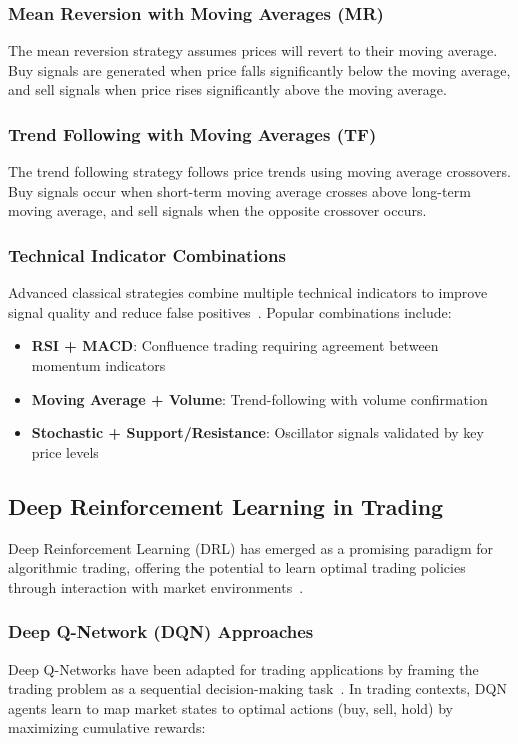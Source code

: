 \documentclass[10pt,twocolumn]{article}
\begin{document}
\subsubsection{Mean Reversion with Moving Averages (MR)}
The mean reversion strategy assumes prices will revert to their moving average. Buy signals are generated when price falls significantly below the moving average, and sell signals when price rises significantly above the moving average.

\subsubsection{Trend Following with Moving Averages (TF)}
The trend following strategy follows price trends using moving average crossovers. Buy signals occur when short-term moving average crosses above long-term moving average, and sell signals when the opposite crossover occurs.

\subsubsection{Technical Indicator Combinations}
Advanced classical strategies combine multiple technical indicators to improve signal quality and reduce false positives~\cite{technical_indicator_combinations}. Popular combinations include:
\begin{itemize}[itemsep=1pt]
\item \textbf{RSI + MACD}: Confluence trading requiring agreement between momentum indicators
\item \textbf{Moving Average + Volume}: Trend-following with volume confirmation
\item \textbf{Stochastic + Support/Resistance}: Oscillator signals validated by key price levels
\end{itemize}

\subsection{Deep Reinforcement Learning in Trading}

Deep Reinforcement Learning (DRL) has emerged as a promising paradigm for algorithmic trading, offering the potential to learn optimal trading policies through interaction with market environments~\cite{drl_trading_survey}.

\subsubsection{Deep Q-Network (DQN) Approaches}
Deep Q-Networks have been adapted for trading applications by framing the trading problem as a sequential decision-making task~\cite{dqn_trading}. In trading contexts, DQN agents learn to map market states to optimal actions (buy, sell, hold) by maximizing cumulative rewards:
\end{document}
